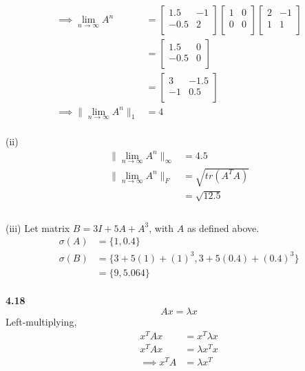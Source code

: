 \documentclass[letterpaper,12pt]{article}
\theoremstyle{definition}
\begin{document}
\begin{align*}
\implies \lim_{n \rightarrow \infty} A^n &=
\begin{bmatrix}
	1.5 & -1 \\
	-0.5 & 2 \\
\end{bmatrix}
\begin{bmatrix}
	1 & 0\\
	0 & 0\\
\end{bmatrix} \begin{bmatrix}
	2 & -1\\
	1 & 1 \\
\end{bmatrix}\\
&= \begin{bmatrix}
	1.5 & 0 \\
	-0.5 & 0 \\
\end{bmatrix}\\
&= \begin{bmatrix}
	3 & -1.5 \\
	-1 & 0.5 \\
\end{bmatrix}\\
\implies \| \lim_{n \rightarrow \infty} A^n \|_1 &= 4
\end{align*}\\

\noindent(ii) \begin{align*}
\| \lim_{n \rightarrow \infty} A^n \|_{\infty} &= 4.5\\
\| \lim_{n \rightarrow \infty} A^n \|_{F} &= \sqrt{tr(A^TA)}\\
&= \sqrt{12.5}\\
\end{align*}\\

\noindent (iii) Let matrix $B = 3I + 5A + A^3$, with $A$ as defined above.
\begin{align*}
\sigma(A) &= \{1, 0.4\}\\
\sigma(B) &= \{3 + 5(1) + (1)^3, 3 + 5(0.4) + (0.4)^3\}\\
&= \{9, 5.064\}
\end{align*}\\

\noindent\textbf{4.18}
\begin{equation*}
Ax = \lambda x
\end{equation*}
Left-multiplying,
\begin{align*}
x^TAx &= x^T \lambda x \\
x^TAx &= \lambda x^T x\\
\implies x^TA &= \lambda x^T
\end{align*}
\end{document}
